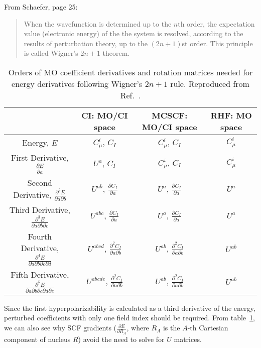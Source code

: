 From Schaefer\cite{Yamaguchi1994}, page 25:
\begin{quote}
  When the wavefunction is determined up to the \(n\)th order, the expectation value (electronic energy) of the the system is resolved, according to the results of perturbation theory, up to the \((2n+1)\)st order. This principle is called Wigner's \(2n+1\) theorem\cite{doi:10.1063/1.1668053,EPSTEIN1980311}.
\end{quote}
\begin{table}
  \centering
  \caption[MO coefficient derivatives and rotation matrices needed for energy derivatives]{Orders of MO coefficient derivatives and rotation matrices needed for energy derivatives following Wigner's \(2n+1\) rule. Reproduced from Ref.~\parencite{Yamaguchi1994}.}
  \label{tutorial:tab:wigner}
  \begin{tabular}{cccc}
    \toprule
    & CI: MO/CI space & MCSCF: MO/CI space & RHF: MO space \\
    \midrule
    Energy, \(E\) & \(C_{\mu}^{i}\), \(C_{I}\) & \(C_{\mu}^{i}\), \(C_{I}\) & \(C_{\mu}^{i}\) \\
    First Derivative, \(\frac{\partial E}{\partial a}\) & \(U^{a}\), \(C_{I}\) & \(C_{\mu}^{i}\), \(C_{I}\) & \(C_{\mu}^{i}\) \\
    Second Derivative, \(\frac{\partial^{2} E}{\partial a \partial b}\) & \(U^{ab}\), \(\frac{\partial C_{I}}{\partial a}\) & \(U^{a}\), \(\frac{\partial C_{I}}{\partial a}\) & \(U^{a}\) \\
    Third Derivative, \(\frac{\partial^{3} E}{\partial a \partial b \partial c}\) & \(U^{abc}\), \(\frac{\partial C_{I}}{\partial a}\) & \(U^{a}\), \(\frac{\partial C_{I}}{\partial a}\) & \(U^{a}\) \\
    Fourth Derivative, \(\frac{\partial^{4} E}{\partial a \partial b \partial c \partial d}\) & \(U^{abcd}\), \(\frac{\partial^{2} C_{I}}{\partial a \partial b}\) & \(U^{ab}\), \(\frac{\partial^{2} C_{I}}{\partial a \partial b}\) & \(U^{ab}\) \\
    Fifth Derivative, \(\frac{\partial^{5} E}{\partial a \partial b \partial c \partial d \partial e}\) & \(U^{abcde}\), \(\frac{\partial^{2} C_{I}}{\partial a \partial b}\) & \(U^{ab}\), \(\frac{\partial^{2} C_{I}}{\partial a \partial b}\) & \(U^{ab}\) \\
    \bottomrule
  \end{tabular}
\end{table}
Since the first hyperpolarizability is calculated as a third derivative of the energy, perturbed coefficients with only one field index should be required. From table~\ref{tutorial:tab:wigner}, we can also see why SCF gradients (\(\frac{\partial E}{\partial R_A}\), where \(R_A\) is the \(A\)-th Cartesian component of nucleus \(R\)) avoid the need to solve for \(U\) matrices.

